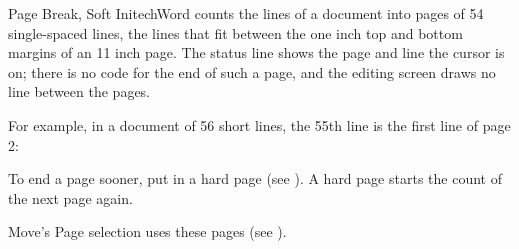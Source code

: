 \begin{Feature}{Page Break, Soft}
InitechWord counts the lines of a document into pages of 54 single-spaced
lines, the lines that fit between the one inch top and bottom margins of an
11 inch page.  The status line shows the page and line the cursor is on;
there is no code for the end of such a page, and the editing screen draws no
line between the pages.

%
For example, in a document of 56 short lines, the 55th line is the first
line of page 2:
%
%
\EndReplay

\Notes
{}
To end a page sooner, put in a hard page (see ).
A hard page starts the count of the next page again.

Move's Page selection uses these pages (see ).

\end{Feature}

